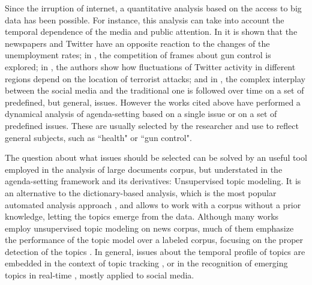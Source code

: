 \documentclass{bmcart}
\begin{document}

\par Since the irruption of internet, a quantitative analysis based on  the access to big data has been possible. For instance, this analysis can take into account the temporal dependence of the media and public attention. 
In \cite{soroka2017negativity} it is shown that the newspapers and Twitter have an opposite reaction to the changes of the unemployment rates; in \cite{guggenheim2015dynamics}, the competition of frames about gun control is explored; in \cite{ali2018measuring}, the authors show how fluctuations of Twitter activity in different regions depend on the location of terrorist attacks; and in \cite{russell2014dynamics}, the complex interplay between the social media and the traditional one is followed over time on a set of predefined, but general, issues.
However the works cited above have performed a dynamical analysis of agenda-setting based on a single issue or on a set of predefined issues. These are usually  selected by the researcher and use to reflect general subjects, such as ``health" or ``gun control".

\par The question about what issues should be selected can be solved by an useful tool employed in the analysis of large documents corpus, but understated in the agenda-setting framework and its derivatives: Unsupervised topic modeling. 
It is an alternative to the dictionary-based analysis, which is the most popular automated analysis approach \cite{guo2016big}, and allows to work with a corpus without a prior knowledge, letting the topics emerge from the data. 
Although many works employ unsupervised topic modeling on news corpus, much of them emphasize the performance of the topic model over a labeled corpus, focusing on the proper detection of the topics \cite{dai2010online, po2016topic, brun2000experiment}. 
In general, issues about the temporal profile of topics are embedded in the context of topic tracking \cite{hu2016news, li2017joint}, or in the recognition of emerging topics in real-time \cite{cataldi2010emerging}, mostly applied to social media. 
\end{document}
